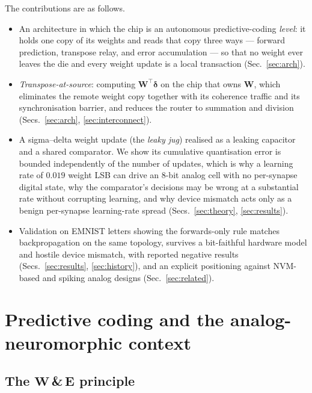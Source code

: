 \documentclass[11pt]{article}
\newcommand{\W}{\bm W}
\newcommand{\bdelta}{\bm\delta}
\newcommand{\E}{\bm E}
\begin{document}
\noindent The contributions are as follows.

\begin{itemize}
\item An architecture in which the chip is an autonomous predictive-coding \emph{level}: it holds
one copy of its weights and reads that copy three ways --- forward prediction, transpose relay, and
error accumulation --- so that no weight ever leaves the die and every weight update is a local
transaction (Sec.~\ref{sec:arch}).
\item \emph{Transpose-at-source}: computing $\W^{\!\top}\bdelta$ on the chip that owns $\W$, which
eliminates the remote weight copy together with its coherence traffic and its synchronisation
barrier, and reduces the router to summation and division (Secs.~\ref{sec:arch},
\ref{sec:interconnect}).
\item A sigma--delta weight update (the \emph{leaky jug}) realised as a leaking capacitor and a
shared comparator. We show its cumulative quantisation error is bounded independently of the number
of updates, which is why a learning rate of $0.019$ weight LSB can drive an 8-bit analog cell with
no per-synapse digital state, why the comparator's decisions may be wrong at a substantial rate
without corrupting learning, and why device mismatch acts only as a benign per-synapse learning-rate
spread (Secs.~\ref{sec:theory}, \ref{sec:results}).
\item Validation on EMNIST letters showing the forwards-only rule matches backpropagation on the same
topology, survives a bit-faithful hardware model and hostile device mismatch, with reported negative
results (Secs.~\ref{sec:results}, \ref{sec:history}), and an explicit positioning against NVM-based
and spiking analog designs (Sec.~\ref{sec:related}).
\end{itemize}

\section{Predictive coding and the analog-neuromorphic context}\label{sec:pc}

\subsection{The \texorpdfstring{$\W$}{W}\,\&\,\texorpdfstring{$\E$}{E} principle}
\end{document}
